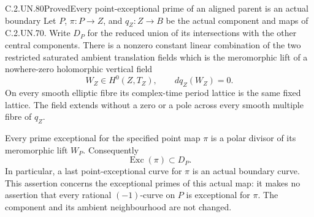 \begin{statement}{C.2.UN.80}{Proved}{Every point-exceptional prime of an aligned parent is an actual boundary}
Let \(P\), \(\pi:P\to Z\), and \(q_Z:Z\to B\) be the
actual component and maps of C.2.UN.70. Write \(D_P\)
for the reduced union of its intersections with the
other central components. There is a nonzero constant
linear combination of the two restricted saturated
ambient translation fields which is the meromorphic
lift of a nowhere-zero holomorphic vertical field
\[
 W_Z\in H^0(Z,T_Z),\qquad dq_Z(W_Z)=0.
 \tag{C.EP.1}
\]
On every smooth elliptic fibre its complex-time period
lattice is the same fixed lattice. The field extends
without a zero or a pole across every smooth multiple
fibre of \(q_Z\).

Every prime exceptional for the specified point map
\(\pi\) is a polar divisor of its meromorphic lift
\(W_P\). Consequently
\[
                 \operatorname{Exc}(\pi)\subset D_P.
 \tag{C.EP.2}
\]
In particular, a last point-exceptional curve for
\(\pi\) is an actual boundary curve. This assertion
concerns the exceptional primes of this actual map:
it makes no assertion that every rational
\((-1)\)-curve on \(P\) is exceptional for \(\pi\).
The component and its ambient neighbourhood are not
changed.
\end{statement}

